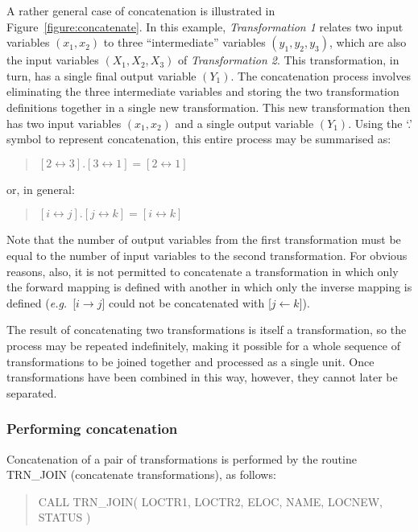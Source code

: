 \documentclass[twoside,nolof,11pt]{starlink}
\providecommand{\name}[1]{\small{#1}}
\begin{document}
A rather general case of concatenation is illustrated in
Figure~\ref{figure:concatenate}.
In this example, \emph{Transformation 1} relates two input variables
\mbox{$(x_1,x_2)$} to three ``intermediate'' variables
\mbox{$(y_1,y_2,y_3)$}, which are also the input variables
\mbox{$(X_1,X_2,X_3)$} of \emph{Transformation 2}.
This transformation, in turn, has a single final output variable
\mbox{$(Y_1)$}.
The concatenation process involves eliminating the three intermediate
variables and storing the two transformation definitions together in a
single new transformation.
This new transformation then has two input variables \mbox{$(x_1,x_2)$} and
a single output variable \mbox{$(Y_1)$}.
Using the `.' symbol to represent concatenation, this entire process may be
summarised as:
\begin{quote}
\begin{center}
$[2 \leftrightarrow 3].[3 \leftrightarrow 1] = [2 \leftrightarrow 1]$
\end{center}
\end{quote}
or, in general:
\begin{quote}
\begin{center}
$[i \leftrightarrow j].[j \leftrightarrow k] = [i \leftrightarrow k]$
\end{center}
\end{quote}
Note that the number of output variables from the first transformation must
be equal to the number of input variables to the second transformation.
For obvious reasons, also, it is not permitted to concatenate a
transformation in which only the forward mapping is defined with another in
which only the inverse mapping is defined (\emph{e.g.}\ \mbox{[$i \rightarrow
j$]} could not be concatenated with \mbox{[$j \leftarrow k$]}).

The result of concatenating two transformations is itself a transformation,
so the process may be repeated indefinitely, making it possible for a whole
sequence of transformations to be joined together and processed as a single
unit.
Once transformations have been combined in this way, however, they cannot
later be separated.

\subsubsection{Performing concatenation}
Concatenation of a pair of transformations is performed by the routine
\name{TRN\_JOIN} (concatenate transformations), as follows:

\begin{quote}
\begin{terminalv}
CALL TRN_JOIN( LOCTR1, LOCTR2, ELOC, NAME, LOCNEW, STATUS )
\end{terminalv}
\end{quote}
\end{document}
